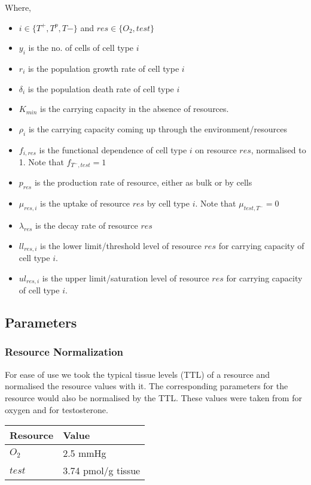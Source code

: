 Where,
\begin{itemize}
  \item $i \in \{T^+,T^p,T-\}$ and $res \in \{O_2,test\}$
  \item $y_i$ is the no. of cells of cell type $i$
  \item $r_i$ is the population growth rate of cell type $i$
  \item $\delta_i$ is the population death rate of cell type $i$
  \item $K_{min}$ is the carrying capacity in the absence of resources.
  \item $\rho_i$ is the carrying capacity coming up through the environment/resources
  \item $f_{i,res}$ is the functional dependence of cell type $i$ on resource $res$, normalised to 1. Note that $f_{T^-,test}=1$
  \item $p_{res}$ is the production rate of resource, either as bulk or by cells
  \item $\mu_{res,i}$ is the uptake of resource $res$ by cell type $i$. Note that $\mu_{test,T^-} = 0$
  \item $\lambda_{res}$ is the decay rate of resource $res$
  \item $ll_{res,i}$ is the lower limit/threshold level of resource $res$ for carrying capacity of cell type $i$.
  \item $ul_{res,i}$ is the upper limit/saturation level of resource $res$ for carrying capacity of cell type $i$.
\end{itemize}

\subsection{Parameters}
\subsubsection{Resource Normalization}
For ease of use we took the typical tissue levels (TTL) of a resource and normalised the resource values with it. The corresponding parameters for the resource would also be normalised by the TTL. These values were taken from \cite{Steward} for oxygen and \cite{Titus} for testosterone.
\begin{table}[h]
\centering
\begin{tabular}{|l|l|}
  \hline
  Resource & Value             \\
  \hline
  $O_2$    & 2.5 mmHg          \\
  $test$   & 3.74 pmol/g tissue\\
  \hline
\end{tabular}
\end{table}
